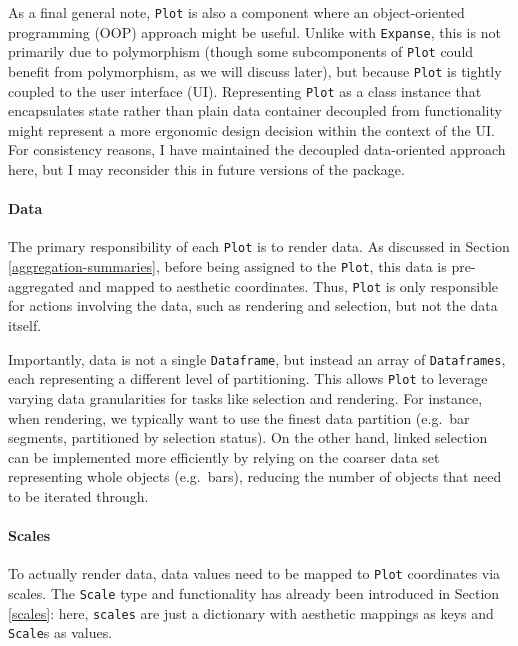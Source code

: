 \documentclass[
  openany]{book}
\theoremstyle{definition}
\theoremstyle{definition}
\theoremstyle{definition}
\theoremstyle{definition}
\theoremstyle{remark}
\begin{document}
As a final general note, \texttt{Plot} is also a component where an object-oriented programming (OOP) approach might be useful. Unlike with \texttt{Expanse}, this is not primarily due to polymorphism (though some subcomponents of \texttt{Plot} could benefit from polymorphism, as we will discuss later), but because \texttt{Plot} is tightly coupled to the user interface (UI). Representing \texttt{Plot} as a class instance that encapsulates state rather than plain data container decoupled from functionality might represent a more ergonomic design decision within the context of the UI. For consistency reasons, I have maintained the decoupled data-oriented approach here, but I may reconsider this in future versions of the package.

\paragraph{Data}\label{plot-data}

The primary responsibility of each \texttt{Plot} is to render data. As discussed in Section \ref{aggregation-summaries}, before being assigned to the \texttt{Plot}, this data is pre-aggregated and mapped to aesthetic coordinates. Thus, \texttt{Plot} is only responsible for actions involving the data, such as rendering and selection, but not the data itself.

Importantly, data is not a single \texttt{Dataframe}, but instead an array of \texttt{Dataframes}, each representing a different level of partitioning. This allows \texttt{Plot} to leverage varying data granularities for tasks like selection and rendering. For instance, when rendering, we typically want to use the finest data partition (e.g.~bar segments, partitioned by selection status). On the other hand, linked selection can be implemented more efficiently by relying on the coarser data set representing whole objects (e.g.~bars), reducing the number of objects that need to be iterated through.

\paragraph{Scales}\label{plot-scales}

To actually render data, data values need to be mapped to \texttt{Plot} coordinates via scales. The \texttt{Scale} type and functionality has already been introduced in Section \ref{scales}: here, \texttt{scales} are just a dictionary with aesthetic mappings as keys and \texttt{Scale}s as values.
\end{document}
